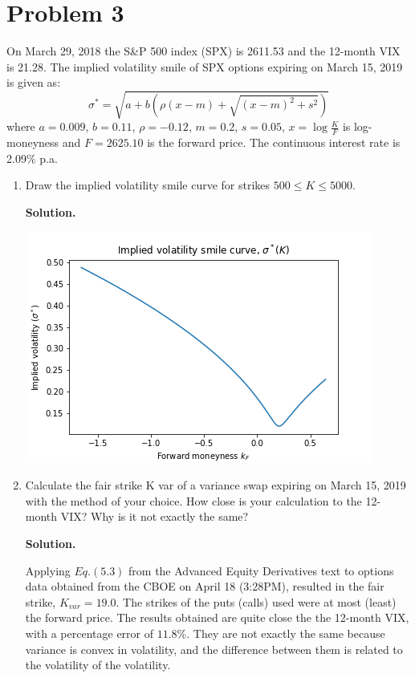 \documentclass[12pt]{article}
\newenvironment{solution}{\vspace{0.2cm} \textbf{Solution.}}{}
\begin{document}
\newpage
	
	\section*{Problem 3}
On March 29, 2018 the S\&P 500 index (SPX) is 2611.53 and the 12-month VIX is 21.28. The implied volatility smile of SPX options expiring on March 15, 2019 is given as:
$$ \sigma^* = \sqrt{a + b \left( \rho (x - m)  + \sqrt{(x-m)^2 + s^2} \right)} $$
where $a = 0.009$, $b = 0.11$, $\rho = −0.12$, $m = 0.2$, $s = 0.05$, $x = \log \frac{K}{F}$ is log-moneyness and $F = 2625.10$ is the forward price. The continuous interest rate is 2.09\% p.a.

	\begin{enumerate}[label=(\alph*)]
	\item Draw the implied volatility smile curve for strikes $500 \leq K \leq 5000$.
	
	\begin{solution}
	
	\includegraphics{impliedVol.png}
	
	\end{solution}
	
	\newpage
	
	\item Calculate the fair strike K var of a variance swap expiring on March 15, 2019 with the method of your choice. How close is your calculation to the 12-month VIX? Why is it not exactly the same?
	
	\begin{solution}
	
	Applying $Eq. (5.3)$ from the Advanced Equity Derivatives text to options data obtained from the CBOE on April 18 (3:28PM), resulted in the fair strike, $K_{var}=19.0.$  The strikes of the puts (calls) used were at most (least) the forward price.
	The results obtained are quite close the the 12-month VIX, with a percentage error of $11.8\%.$  They are not exactly the same because variance is convex in volatility, and the difference between them is related to the volatility of the volatility.
	
	
	\end{solution}	

	\end{enumerate}
\end{document}
